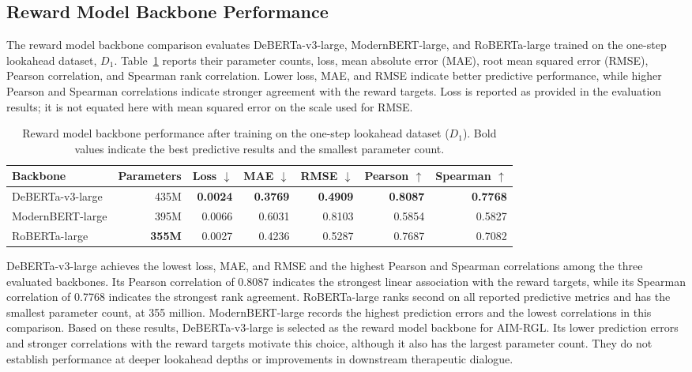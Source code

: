 \subsection{Reward Model Backbone Performance}

The reward model backbone comparison evaluates DeBERTa-v3-large, ModernBERT-large, and RoBERTa-large trained on the one-step lookahead dataset, \(D_1\). Table~\ref{tab:reward-backbone-d1} reports their parameter counts, loss, mean absolute error (MAE), root mean squared error (RMSE), Pearson correlation, and Spearman rank correlation. Lower loss, MAE, and RMSE indicate better predictive performance, while higher Pearson and Spearman correlations indicate stronger agreement with the reward targets. Loss is reported as provided in the evaluation results; it is not equated here with mean squared error on the scale used for RMSE.

\begin{table}[htbp]
\centering
\caption{Reward model backbone performance after training on the one-step lookahead dataset (\(D_1\)). Bold values indicate the best predictive results and the smallest parameter count.}
\label{tab:reward-backbone-d1}
\small
\setlength{\tabcolsep}{4pt}
\begin{tabular}{lrrrrrr}
\hline
Backbone & Parameters & Loss $\downarrow$ & MAE $\downarrow$ & RMSE $\downarrow$ & Pearson $\uparrow$ & Spearman $\uparrow$ \\
\hline
DeBERTa-v3-large & 435M & \textbf{0.0024} & \textbf{0.3769} & \textbf{0.4909} & \textbf{0.8087} & \textbf{0.7768} \\
ModernBERT-large & 395M & 0.0066 & 0.6031 & 0.8103 & 0.5854 & 0.5827 \\
RoBERTa-large & \textbf{355M} & 0.0027 & 0.4236 & 0.5287 & 0.7687 & 0.7082 \\
\hline
\end{tabular}
\end{table}

DeBERTa-v3-large achieves the lowest loss, MAE, and RMSE and the highest Pearson and Spearman correlations among the three evaluated backbones. Its Pearson correlation of 0.8087 indicates the strongest linear association with the reward targets, while its Spearman correlation of 0.7768 indicates the strongest rank agreement. RoBERTa-large ranks second on all reported predictive metrics and has the smallest parameter count, at 355 million. ModernBERT-large records the highest prediction errors and the lowest correlations in this comparison. Based on these results, DeBERTa-v3-large is selected as the reward model backbone for AIM-RGL. Its lower prediction errors and stronger correlations with the reward targets motivate this choice, although it also has the largest parameter count. They do not establish performance at deeper lookahead depths or improvements in downstream therapeutic dialogue.


